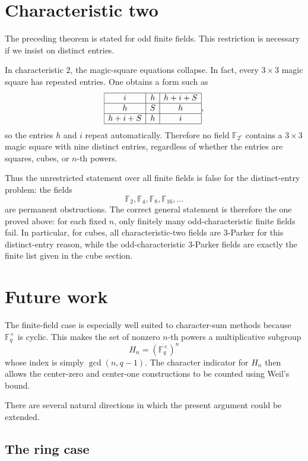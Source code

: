 \documentclass{article}
\newcommand{\F}{\mathbb F}
\theoremstyle{definition}
\numberwithin{equation}{section}
\begin{document}
\section{Characteristic two}
\label{sec:char_two}

The preceding theorem is stated for odd finite fields.  This restriction is
necessary if we insist on distinct entries.

In characteristic \(2\), the magic-square equations collapse.  In fact, every
\(3\times3\) magic square has repeated entries.  One obtains a form such as
\[
\begin{array}{|c|c|c|}
\hline
 i & h & h+i+S\\
\hline
 h & S & h\\
\hline
 h+i+S & h & i\\
\hline
\end{array},
\]
so the entries \(h\) and \(i\) repeat automatically.  Therefore no field
\(\F_{2^r}\) contains a \(3\times3\) magic square with nine distinct entries,
regardless of whether the entries are squares, cubes, or \(n\)-th powers.

Thus the unrestricted statement over all finite fields is false for the
distinct-entry problem: the fields
\[
\F_2,\F_4,\F_8,\F_{16},\ldots
\]
are permanent obstructions.  The correct general statement is therefore the one
proved above: for each fixed \(n\), only finitely many odd-characteristic finite
fields fail.  In particular, for cubes, all characteristic-two fields are
\(3\)-Parker for this distinct-entry reason, while the odd-characteristic
\(3\)-Parker fields are exactly the finite list given in the cube section.


\section{Future work}

The finite-field case is especially well suited to character-sum methods because
\(\F_q^\times\) is cyclic. This makes the set of nonzero \(n\)-th powers a
multiplicative subgroup
\[
H_n=(\F_q^\times)^n
\]
whose index is simply \(\gcd(n,q-1)\). The character indicator for \(H_n\) then
allows the center-zero and center-one constructions to be counted using Weil's
bound.

There are several natural directions in which the present argument could be
extended.

\subsection{The ring case}
\end{document}
